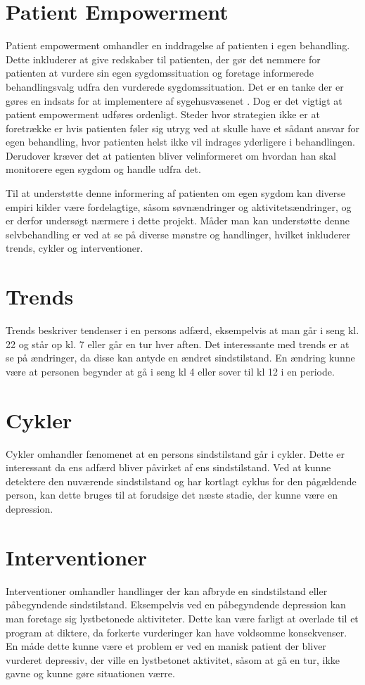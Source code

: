 \section{Patient Empowerment}
Patient empowerment omhandler en inddragelse af patienten i egen behandling.
Dette inkluderer at give redskaber til patienten, der gør det nemmere for patienten at vurdere sin egen sygdomssituation og foretage informerede behandlingsvalg udfra den vurderede sygdomssituation.
Det er en tanke der er gøres en indsats for at implementere af sygehusvæsenet \citep{misc:patientpowerhovedstaden}.
Dog er det vigtigt at patient empowerment udføres ordenligt.
Steder hvor strategien ikke er at foretrække er hvis patienten føler sig utryg ved at skulle have et sådant ansvar for egen behandling, hvor patienten helst ikke vil indrages yderligere i behandlingen.
Derudover kræver det at patienten bliver velinformeret om hvordan han skal monitorere egen sygdom og handle udfra det.

Til at understøtte denne informering af patienten om egen sygdom kan diverse empiri kilder være fordelagtige, såsom søvnændringer og aktivitetsændringer\citep{misc:jorgen-aagaard}, og er derfor undersøgt nærmere i dette projekt.
Måder man kan understøtte denne selvbehandling er ved at se på diverse mønstre og handlinger, hvilket inkluderer trends, cykler og interventioner.

\section{Trends}
Trends beskriver tendenser i en persons adfærd, eksempelvis at man går i seng kl. 22 og står op kl. 7 eller går en tur hver aften.
Det interessante med trends er at se på ændringer, da disse kan antyde en ændret sindstilstand.
En ændring kunne være at personen begynder at gå i seng kl 4 eller sover til kl 12 i en periode.

\section{Cykler}
Cykler omhandler fænomenet at en persons sindstilstand går i cykler.
Dette er interessant da ens adfærd bliver påvirket af ens sindstilstand.
Ved at kunne detektere den nuværende sindstilstand og har kortlagt cyklus for den pågældende person, kan dette bruges til at forudsige det næste stadie, der kunne være en depression.

\section{Interventioner}
Interventioner omhandler handlinger der kan afbryde en sindstilstand eller påbegyndende sindstilstand.
Eksempelvis ved en påbegyndende depression kan man foretage sig lystbetonede aktiviteter.
Dette kan være farligt at overlade til et program at diktere, da forkerte vurderinger kan have voldsomme konsekvenser.
En måde dette kunne være et problem er ved en manisk patient der bliver vurderet depressiv, der ville en lystbetonet aktivitet, såsom at gå en tur, ikke gavne og kunne gøre situationen værre.